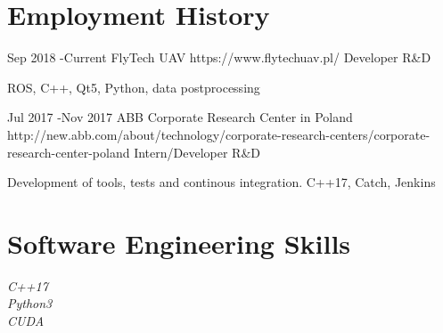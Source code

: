 \documentclass[10pt]{article} %
\begin{document}



\section{Employment History}

\job
{Sep 2018 -}{Current}
{FlyTech UAV}
{https://www.flytechuav.pl/}
{Developer R\&D}
{ROS, C++, Qt5, Python, data postprocessing\\
\rule{0mm}{5mm}}

\job
{Jul 2017 -}{Nov 2017}
{ABB Corporate Research Center in Poland}
{http://new.abb.com/about/technology/corporate-research-centers/corporate-research-center-poland}
{Intern/Developer R\&D}
{Development of tools, tests and continous integration. C++17, Catch, Jenkins\\
\rule{0mm}{5mm}}




\section{Software Engineering Skills}

{
\begin{minipage}{0.1\textwidth}
\textit{C++17} \\
\textit{Python3} \\
\textit{CUDA} \\
\end{minipage}
\begin{minipage}{0.1\textwidth}
\FiveStar \FiveStar \FiveStar \\
\FiveStar \FiveStar \FiveStarOpen \\
\FiveStar \FiveStar \FiveStarOpen \\
\end{minipage}
}
\end{document}
